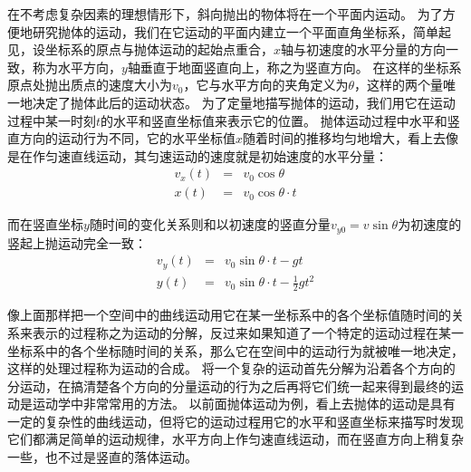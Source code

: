 在不考虑复杂因素的理想情形下，斜向抛出的物体将在一个平面内运动。
为了方便地研究抛体的运动，我们在它运动的平面内建立一个平面直角坐标系，简单起见，设坐标系的原点与抛体运动的起始点重合，$x$轴与初速度的水平分量的方向一致，称为水平方向，$y$轴垂直于地面竖直向上，称之为竖直方向。
在这样的坐标系原点处抛出质点的速度大小为$v_0$，它与水平方向的夹角定义为$\theta$，这样的两个量唯一地决定了抛体此后的运动状态。
为了定量地描写抛体的运动，我们用它在运动过程中某一时刻$t$的水平和竖直坐标值来表示它的位置。
抛体运动过程中水平和竖直方向的运动行为不同，它的水平坐标值$x$随着时间的推移均匀地增大，看上去像是在作匀速直线运动，其匀速运动的速度就是初始速度的水平分量：
\begin{eqnarray}
v_x(t)& =& v_0\cos\theta\label{eqn: motion-抛体的水平速度}\\
x(t) &=& v_0\cos\theta\cdot  t\label{eqn: motion-抛体的水平运动}
\end{eqnarray}

而在竖直坐标$y$随时间的变化关系则和以初速度的竖直分量$v_{y0} = v\sin\theta$为初速度的竖起上抛运动完全一致：
\begin{eqnarray}
v_y(t)& =& v_0\sin\theta\cdot  t-gt\label{eqn: motion-抛体的竖直速度}\\
y(t) &=& v_0\sin\theta\cdot t-\frac{1}{2}gt^2\label{eqn: motion-抛体的竖直运动}
\end{eqnarray}

像上面那样把一个空间中的曲线运动用它在某一坐标系中的各个坐标值随时间的关系来表示的过程称之为{\heiti 运动的分解}，反过来如果知道了一个特定的运动过程在某一坐标系中的各个坐标随时间的关系，那么它在空间中的运动行为就被唯一地决定，这样的处理过程称为{\heiti 运动的合成}。
将一个复杂的运动首先分解为沿着各个方向的分运动，在搞清楚各个方向的分量运动的行为之后再将它们统一起来得到最终的运动是运动学中非常常用的方法。
以前面抛体运动为例，看上去抛体的运动是具有一定的复杂性的曲线运动，但将它的运动过程用它的水平和竖直坐标来描写时发现它们都满足简单的运动规律，水平方向上作匀速直线运动，而在竖直方向上稍复杂一些，也不过是竖直的落体运动。


